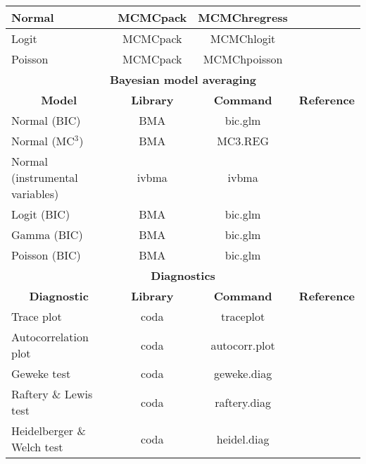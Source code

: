 \begin{table}[!ht]
\begin{center}
{{\begin{tabular}{|l|c|c|c|}
	\hline
	Normal & MCMCpack & MCMChregress & \cite{Martin2018} \\
	\hline
	Logit & MCMCpack & MCMChlogit & \cite{Martin2018} \\
	\hline
	Poisson & MCMCpack & MCMChpoisson & \cite{Martin2018} \\
	\hline
	\multicolumn{4}{|c|}{\textbf{Bayesian model averaging}} \\
	\hline  
	\multicolumn{1}{|c|}{\textbf{Model}} & \multicolumn{1}{c}{\textbf{Library}} & \multicolumn{1}{|c|}{\textbf{Command}} &
	\multicolumn{1}{|c|}{\textbf{Reference}} \\ 
	\hline
	Normal (BIC) & BMA & bic.glm & \cite{Raftery2012} \\
	Normal (MC$^3$) & BMA & MC3.REG & \cite{Raftery2012} \\
	Normal (instrumental variables) & ivbma & ivbma & \cite{Lenkoski2013} \\
	Logit (BIC) & BMA & bic.glm & \cite{Raftery2012} \\
	Gamma (BIC) & BMA & bic.glm & \cite{Raftery2012} \\
	Poisson (BIC) & BMA & bic.glm & \cite{Raftery2012} \\
	\hline
	\multicolumn{4}{|c|}{\textbf{Diagnostics}} \\
	\hline  
	\multicolumn{1}{|c|}{\textbf{Diagnostic}} & \multicolumn{1}{c}{\textbf{Library}} & \multicolumn{1}{|c|}{\textbf{Command}} &
	\multicolumn{1}{|c|}{\textbf{Reference}} \\ 
	\hline
	Trace plot & coda & traceplot & \cite{Plummer2016} \\
	Autocorrelation plot & coda & autocorr.plot & \cite{Plummer2016} \\
	Geweke test & coda & geweke.diag & \cite{Plummer2016} \\
	Raftery \& Lewis test & coda & raftery.diag & \cite{Plummer2016} \\
	Heidelberger \& Welch test & coda & heidel.diag & \cite{Plummer2016} \\
	\hline
	\end{tabular}
}}
\end{center}
\end{table}